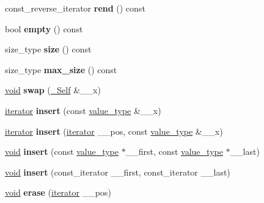 \begin{DoxyCompactItemize}
const\+\_\+reverse\+\_\+iterator {\bfseries rend} () const
\item 
\mbox{\label{classmultimap_a0c0b0f4e2c2fa7108069e7ac8b7a88e4}} 
bool {\bfseries empty} () const
\item 
\mbox{\label{classmultimap_a61e750749ca46945691a4b4771c818b0}} 
size\+\_\+type {\bfseries size} () const
\item 
\mbox{\label{classmultimap_a0440edc0394de862f5dcf66cd585cf10}} 
size\+\_\+type {\bfseries max\+\_\+size} () const
\item 
\mbox{\label{classmultimap_a09d83b33c691188007844cb573a0bff2}} 
\hyperlink{interfacevoid}{void} {\bfseries swap} (\hyperlink{classmultimap}{\+\_\+\+Self} \&\+\_\+\+\_\+x)
\item 
\mbox{\label{classmultimap_ae119972700f07b17ebd4a416942997c1}} 
\hyperlink{structiterator}{iterator} {\bfseries insert} (const \hyperlink{structpair}{value\+\_\+type} \&\+\_\+\+\_\+x)
\item 
\mbox{\label{classmultimap_a80e077e0a73e4446e6b8c1b06fe9facb}} 
\hyperlink{structiterator}{iterator} {\bfseries insert} (\hyperlink{structiterator}{iterator} \+\_\+\+\_\+pos, const \hyperlink{structpair}{value\+\_\+type} \&\+\_\+\+\_\+x)
\item 
\mbox{\label{classmultimap_a34997a13aed8ac8eb3932bed67e152f7}} 
\hyperlink{interfacevoid}{void} {\bfseries insert} (const \hyperlink{structpair}{value\+\_\+type} $\ast$\+\_\+\+\_\+first, const \hyperlink{structpair}{value\+\_\+type} $\ast$\+\_\+\+\_\+last)
\item 
\mbox{\label{classmultimap_a3e21f3a0e5c0d25764e4d8f45d3ab195}} 
\hyperlink{interfacevoid}{void} {\bfseries insert} (const\+\_\+iterator \+\_\+\+\_\+first, const\+\_\+iterator \+\_\+\+\_\+last)
\item 
\mbox{\label{classmultimap_a2c030b5584a36091f0e084c8f8bcdc0a}} 
\hyperlink{interfacevoid}{void} {\bfseries erase} (\hyperlink{structiterator}{iterator} \+\_\+\+\_\+pos)
\item 

\end{DoxyCompactItemize}
